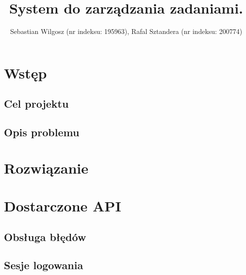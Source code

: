 \documentclass[eng,printmode]{02_class}
\title{System do zarządzania zadaniami.}
\author{Sebastian Wilgosz (nr indeksu: 195963), Rafal Sztandera (nr indeksu: 200774) }
\begin{document}
  \maketitle
  \tableofcontents

  \chapter{Wstęp}
  \label{chapter:introduction}
    \section{Cel projektu}
    \label{section:target}
    

    \section{Opis problemu}
    \label{section:problem}
    

    \chapter{Rozwiązanie}
    \label{section:solution}
    




  \chapter{Dostarczone API}
  \label{chapter:api}
  
    \section{Obsługa błędów}
    \label{section:api-errors}
    

    \section{Sesje logowania}
    \label{section:sessions}
    
\end{document}
